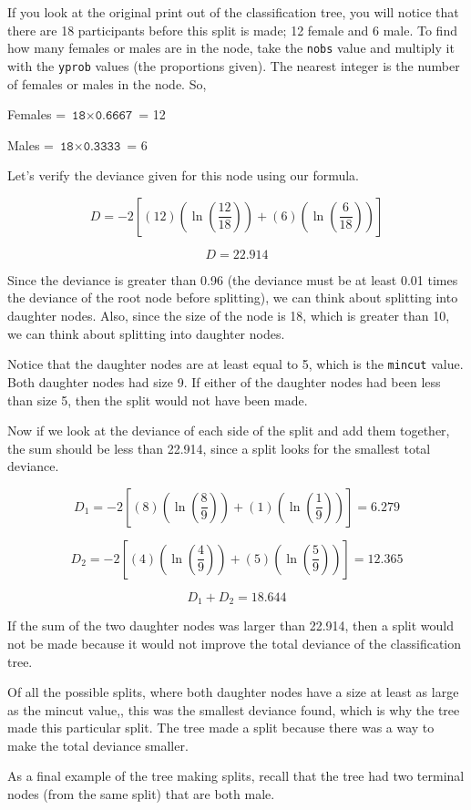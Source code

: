 \documentclass[12pt,twoside]{reedthesis}
\begin{document}
  If you look at the original print out of the classification tree, you
  will notice that there are 18 participants before this split is made; 12
  female and 6 male. To find how many females or males are in the node,
  take the \texttt{nobs} value and multiply it with the \texttt{yprob}
  values (the proportions given). The nearest integer is the number of
  females or males in the node. So,
  
  Females = \(\texttt{18}\times\texttt{0.6667}\) = 12
  
  Males = \(\texttt{18}\times\texttt{0.3333}\) = 6
  
  Let's verify the deviance given for this node using our formula.
  
  \[D = -2[(12)(\ln(\frac{12}{18})) + (6)(\ln(\frac{6}{18}))]\]
  
  \[D = 22.914\]
  
  Since the deviance is greater than 0.96 (the deviance must be at least
  0.01 times the deviance of the root node before splitting), we can think
  about splitting into daughter nodes. Also, since the size of the node is
  18, which is greater than 10, we can think about splitting into daughter
  nodes.
  
  Notice that the daughter nodes are at least equal to 5, which is the
  \texttt{mincut} value. Both daughter nodes had size 9. If either of the
  daughter nodes had been less than size 5, then the split would not have
  been made.
  
  Now if we look at the deviance of each side of the split and add them
  together, the sum should be less than 22.914, since a split looks for
  the smallest total deviance.
  
  \[D_1 = -2[(8)(\ln(\frac{8}{9})) + (1)(\ln(\frac{1}{9}))] = 6.279\]
  
  \[D_2 = -2[(4)(\ln(\frac{4}{9})) + (5)(\ln(\frac{5}{9}))] = 12.365\]
  
  \[D_1 + D_2 = 18.644\]
  
  If the sum of the two daughter nodes was larger than 22.914, then a
  split would not be made because it would not improve the total deviance
  of the classification tree.
  
  Of all the possible splits, where both daughter nodes have a size at
  least as large as the mincut value,, this was the smallest deviance
  found, which is why the tree made this particular split. The tree made a
  split because there was a way to make the total deviance smaller.
  
  As a final example of the tree making splits, recall that the tree had
  two terminal nodes (from the same split) that are both male.
  
\end{document}

